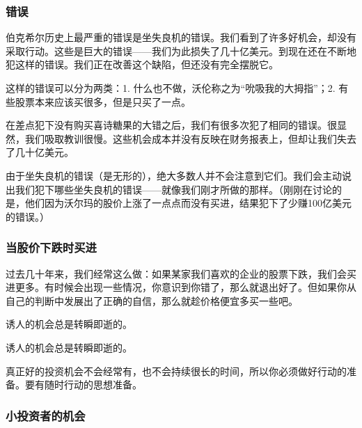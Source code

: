 \subsubsection*{错误}

伯克希尔历史上最严重的错误是坐失良机的错误。我们看到了许多好机会，却没有采取行动。这些是巨大的错误——我们为此损失了几十亿美元。到现在还在不断地犯这样的错误。我们正在改善这个缺陷，但还没有完全摆脱它。
\par

这样的错误可以分为两类：1. 什么也不做，沃伦称之为“吮吸我的大拇指”；2. 有些股票本来应该买很多，但是只买了一点。
\par

在差点犯下没有购买喜诗糖果的大错之后，我们有很多次犯了相同的错误。很显然，我们吸取教训很慢。这些机会成本并没有反映在财务报表上，但却让我们失去了几十亿美元。
\par

由于坐失良机的错误（是无形的），绝大多数人并不会注意到它们。我们会主动说出我们犯下哪些坐失良机的错误——就像我们刚才所做的那样。（刚刚在讨论的是，他们因为沃尔玛的股价上涨了一点点而没有买进，结果犯下了少赚100亿美元的错误。）
\par

\subsubsection*{当股价下跌时买进}

过去几十年来，我们经常这么做：如果某家我们喜欢的企业的股票下跌，我们会买进更多。有时候会出现一些情况，你意识到你错了，那么就退出好了。但如果你从自己的判断中发展出了正确的自信，那么就趁价格便宜多买一些吧。
\par

诱人的机会总是转瞬即逝的。
\par

\begin{WisdomBox}
\par

诱人的机会总是转瞬即逝的。
\par
\end{WisdomBox}

真正好的投资机会不会经常有，也不会持续很长的时间，所以你必须做好行动的准备。要有随时行动的思想准备。
\par

\subsubsection*{小投资者的机会}

